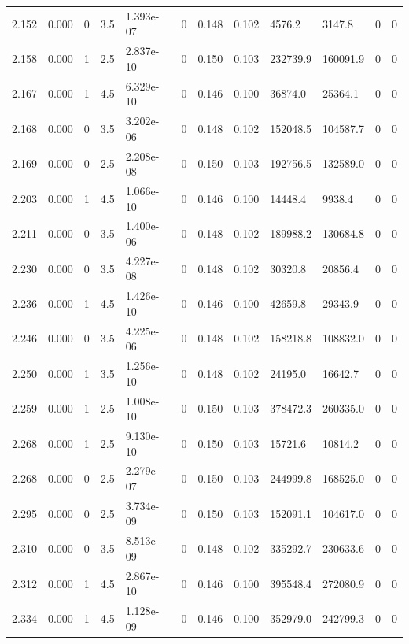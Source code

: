 \documentclass[preview]{standalone}
\begin{document}
{{{{{\begin{tabular}{L{1.2cm}C{1.2cm} C{0.3cm}C{0.5cm} C{1.4cm}C{1.4cm} C{1.4cm}C{1.4cm} C{1.6cm}C{1.6cm} C{1.6cm}C{1.6cm}}
  2.152  &  0.000  & 0     & 3.5 &  1.393e-07  & 0  &  0.148&   0.102& 4576.2 & 3147.8   &  0 & 0  \\ 
  2.158  &  0.000  & 1     & 2.5 &  2.837e-10  & 0  &  0.150&   0.103& 232739.9 & 160091.9   &  0 & 0  \\ 
  2.167  &  0.000  & 1     & 4.5 &  6.329e-10  & 0  &  0.146&   0.100& 36874.0 & 25364.1   &  0 & 0  \\ 
  2.168  &  0.000  & 0     & 3.5 &  3.202e-06  & 0  &  0.148&   0.102& 152048.5 & 104587.7   &  0 & 0  \\ 
  2.169  &  0.000  & 0     & 2.5 &  2.208e-08  & 0  &  0.150&   0.103& 192756.5 & 132589.0   &  0 & 0  \\ 
  2.203  &  0.000  & 1     & 4.5 &  1.066e-10  & 0  &  0.146&   0.100& 14448.4 & 9938.4   &  0 & 0  \\ 
  2.211  &  0.000  & 0     & 3.5 &  1.400e-06  & 0  &  0.148&   0.102& 189988.2 & 130684.8   &  0 & 0  \\ 
  2.230  &  0.000  & 0     & 3.5 &  4.227e-08  & 0  &  0.148&   0.102& 30320.8 & 20856.4   &  0 & 0  \\ 
  2.236  &  0.000  & 1     & 4.5 &  1.426e-10  & 0  &  0.146&   0.100& 42659.8 & 29343.9   &  0 & 0  \\ 
  2.246  &  0.000  & 0     & 3.5 &  4.225e-06  & 0  &  0.148&   0.102& 158218.8 & 108832.0   &  0 & 0  \\ 
  2.250  &  0.000  & 1     & 3.5 &  1.256e-10  & 0  &  0.148&   0.102& 24195.0 & 16642.7   &  0 & 0  \\ 
  2.259  &  0.000  & 1     & 2.5 &  1.008e-10  & 0  &  0.150&   0.103& 378472.3 & 260335.0   &  0 & 0  \\ 
  2.268  &  0.000  & 1     & 2.5 &  9.130e-10  & 0  &  0.150&   0.103& 15721.6 & 10814.2   &  0 & 0  \\ 
  2.268  &  0.000  & 0     & 2.5 &  2.279e-07  & 0  &  0.150&   0.103& 244999.8 & 168525.0   &  0 & 0  \\ 
  2.295  &  0.000  & 0     & 2.5 &  3.734e-09  & 0  &  0.150&   0.103& 152091.1 & 104617.0   &  0 & 0  \\ 
  2.310  &  0.000  & 0     & 3.5 &  8.513e-09  & 0  &  0.148&   0.102& 335292.7 & 230633.6   &  0 & 0  \\ 
  2.312  &  0.000  & 1     & 4.5 &  2.867e-10  & 0  &  0.146&   0.100& 395548.4 & 272080.9   &  0 & 0  \\ 
  2.334  &  0.000  & 1     & 4.5 &  1.128e-09  & 0  &  0.146&   0.100& 352979.0 & 242799.3   &  0 & 0  \\ 

\end{tabular}}}}}}
\end{document}
